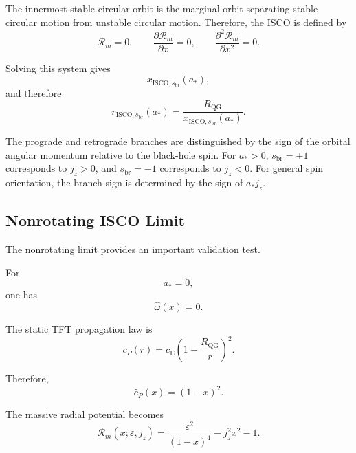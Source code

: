 The innermost stable circular orbit is the marginal orbit separating stable circular motion from unstable circular motion. Therefore, the ISCO is defined by
\begin{equation}
    \boxed{ \mathcal{R}_m = 0, \qquad \frac{\partial \mathcal{R}_m}{\partial x} = 0, \qquad \frac{\partial^2\mathcal{R}_m}{\partial x^2} = 0. }
\end{equation}

Solving this system gives
\begin{equation}
    x_{\mathrm{ISCO},s_{\mathrm{br}}}(a_\ast),
\end{equation}
and therefore
\begin{equation}
    \boxed{ r_{\mathrm{ISCO},s_{\mathrm{br}}}(a_\ast) = \frac{R_{\mathrm{QG}}}{x_{\mathrm{ISCO},s_{\mathrm{br}}}(a_\ast)}. }
\end{equation}

The prograde and retrograde branches are distinguished by the sign of the orbital angular momentum relative to the black-hole spin. For $a_\ast>0$, $s_{\mathrm{br}}=+1$ corresponds to $j_z>0$, and $s_{\mathrm{br}}=-1$ corresponds to $j_z<0$. For general spin orientation, the branch sign is determined by the sign of $a_\ast j_z$.

\subsection{Nonrotating ISCO Limit}

The nonrotating limit provides an important validation test.

For
\begin{equation}
    a_\ast = 0,
\end{equation}
one has
\begin{equation}
    \widehat{\omega}(x) = 0.
\end{equation}

The static TFT propagation law is
\begin{equation}
    c_P(r) = c_{\mathrm{E}} \left( 1-\frac{R_{\mathrm{QG}}}{r} \right)^2.
\end{equation}

Therefore,
\begin{equation}
    \widehat{c}_P(x) = (1-x)^2.
\end{equation}

The massive radial potential becomes
\begin{equation}
    \mathcal{R}_m(x;\varepsilon,j_z) = \frac{\varepsilon^2}{(1-x)^4} - j_z^2x^2 - 1.
\end{equation}

